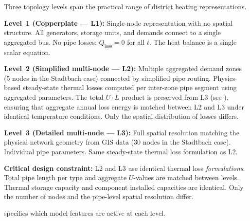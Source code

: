 \documentclass[review,3p]{elsarticle}
\begin{document}
Three topology levels span the practical range of district heating
representations.

\textbf{Level~1 (Copperplate --- L1):} Single-node representation
with no spatial structure. All generators, storage units, and demands
connect to a single aggregated bus. No pipe losses: $Q_{\mathrm{loss}}=0$
for all $t$. The heat balance is a single scalar equation.

\textbf{Level~2 (Simplified multi-node --- L2):} Multiple aggregated
demand zones (5 nodes in the Stadtbach case) connected by simplified
pipe routing. Physics-based steady-state thermal losses computed per
inter-zone pipe segment using aggregated parameters. The total
$U \cdot L$ product is preserved from L3 (see ),
ensuring that aggregate annual loss energy is matched between L2 and
L3 under identical temperature conditions. Only the spatial distribution
of losses differs.

\textbf{Level~3 (Detailed multi-node --- L3):} Full spatial resolution
matching the physical network geometry from GIS data (30 nodes in the
Stadtbach case). Individual pipe parameters. Same steady-state thermal
loss formulation as L2.

\textbf{Critical design constraint:} L2 and L3 use identical thermal
loss \emph{formulations}. Total pipe length per type and aggregate
$U$-values are matched between levels. Thermal storage capacity and
component installed capacities are identical. Only the number of nodes
and the pipe-level spatial resolution differ.

 specifies which model features are active
at each level.
\end{document}
